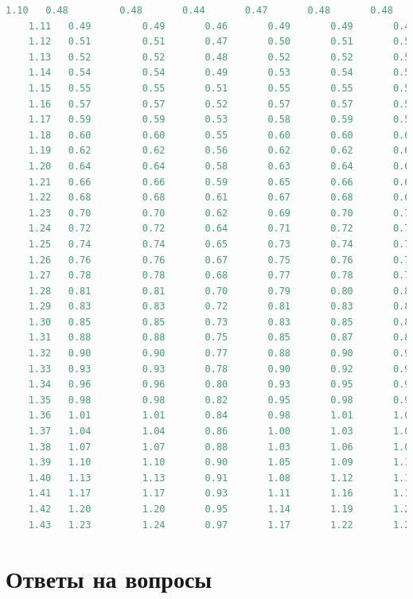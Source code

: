 \documentclass[12pt]{report}
\begin{document}
\begin{lstlisting}[language=Python]
	1.10   0.48         0.48       0.44       0.47       0.48       0.48
	1.11   0.49         0.49       0.46       0.49       0.49       0.49
	1.12   0.51         0.51       0.47       0.50       0.51       0.51
	1.13   0.52         0.52       0.48       0.52       0.52       0.52
	1.14   0.54         0.54       0.49       0.53       0.54       0.54
	1.15   0.55         0.55       0.51       0.55       0.55       0.55
	1.16   0.57         0.57       0.52       0.57       0.57       0.57
	1.17   0.59         0.59       0.53       0.58       0.59       0.59
	1.18   0.60         0.60       0.55       0.60       0.60       0.60
	1.19   0.62         0.62       0.56       0.62       0.62       0.62
	1.20   0.64         0.64       0.58       0.63       0.64       0.64
	1.21   0.66         0.66       0.59       0.65       0.66       0.66
	1.22   0.68         0.68       0.61       0.67       0.68       0.68
	1.23   0.70         0.70       0.62       0.69       0.70       0.70
	1.24   0.72         0.72       0.64       0.71       0.72       0.72
	1.25   0.74         0.74       0.65       0.73       0.74       0.74
	1.26   0.76         0.76       0.67       0.75       0.76       0.76
	1.27   0.78         0.78       0.68       0.77       0.78       0.78
	1.28   0.81         0.81       0.70       0.79       0.80       0.81
	1.29   0.83         0.83       0.72       0.81       0.83       0.83
	1.30   0.85         0.85       0.73       0.83       0.85       0.85
	1.31   0.88         0.88       0.75       0.85       0.87       0.88
	1.32   0.90         0.90       0.77       0.88       0.90       0.90
	1.33   0.93         0.93       0.78       0.90       0.92       0.93
	1.34   0.96         0.96       0.80       0.93       0.95       0.95
	1.35   0.98         0.98       0.82       0.95       0.98       0.98
	1.36   1.01         1.01       0.84       0.98       1.01       1.01
	1.37   1.04         1.04       0.86       1.00       1.03       1.04
	1.38   1.07         1.07       0.88       1.03       1.06       1.07
	1.39   1.10         1.10       0.90       1.05       1.09       1.10
	1.40   1.13         1.13       0.91       1.08       1.12       1.13
	1.41   1.17         1.17       0.93       1.11       1.16       1.16
	1.42   1.20         1.20       0.95       1.14       1.19       1.20
	1.43   1.23         1.24       0.97       1.17       1.22       1.23
\end{lstlisting}

\chapter{Ответы на вопросы}
\end{document}
